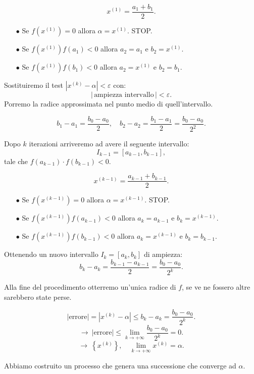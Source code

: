 \[
x^{(1)} = \frac{a_1+b_1}{2}.
\]

\begin{itemize}
\item[$\bullet$]Se $f(x^{(1)}) = 0$ allora $\alpha = x^{(1)}$. STOP.
\item[$\bullet$]Se $f(x^{(1)})f(a_1) < 0$ allora $a_2 = a_1$ e $b_2 = x^{(1)}$.
\item[$\bullet$]Se $f(x^{(1)})f(b_1) < 0$ allora $a_2 = x^{(1)}$ e $b_2 = b_1$.
\end{itemize}

Sostituiremo il test $\left|x^{(k)} -\alpha\right| < \varepsilon$ con:
\[
\left| \,\textrm{ampiezza intervallo}\,\right| < \varepsilon.
\]
Porremo la radice approssimata nel punto medio di quell'intervallo.

\[
b_1-a_1 = \frac{b_0 - a_0}{2}, \quad b_2-a_2 = \frac{b_1-a_1}{2} = 
\frac{b_0 - a_0}{2^2}.
\]

Dopo $k$ iterazioni arriveremo ad avere il seguente intervallo:
\[I_{k-1} = [a_{k-1},b_{k-1}],\]
tale che $f(a_{k-1})\cdot f(b_{k-1}) < 0$.

\[
x^{(k-1)} = \frac{a_{k-1}+b_{k-1}}{2}.
\]


\begin{itemize}
\item[$\bullet$]Se $f(x^{({k-1})}) = 0$ allora $\alpha = x^{({k-1})}$. STOP.
\item[$\bullet$]Se $f(x^{({k-1})})f(a_{k-1}) < 0$ allora $a_k = a_{k-1}$ e 
$b_k = x^{({k-1})}$.
\item[$\bullet$]Se $f(x^{({k-1})})f(b_{k-1}) < 0$ allora $a_k = x^{({k-1})}$ e 
$b_k = b_{k-1}$.
\end{itemize}

Ottenendo un nuovo intervallo $I_k = [a_k,b_k]$ di ampiezza:
\[b_k-a_k = \frac{b_{k-1}-a_{k-1}}{2} = \frac{b_0 - a_0}{2^k}.\]

\begin{osse}
Alla fine del procedimento otterremo un'unica radice di $f$, se ve ne fossero
altre sarebbero state perse.
\end{osse}

\[
|\textrm{errore}| = \left| x^{(k)} - \alpha \right|
\leq b_k-a_k = \frac{b_0 - a_0}{2^k}.\]
\[\longrightarrow \ |\textrm{errore}| \leq 
\lim_{k \to +\infty}\frac{b_0 - a_0}{2^k} = 0.\]
\[\longrightarrow \ \left\{x^{(k)}\right\}, \quad \lim_{k \to + \infty} x^{(k)}
= \alpha.\]

Abbiamo costruito un processo che genera una successione che converge ad
$\alpha$. 

